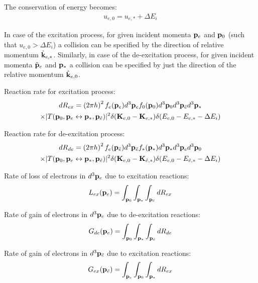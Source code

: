 \documentclass{article}[draft]
\begin{document}
The conservation of energy becomes:
\begin{align*}
u_{e,0} = u_{e,*} + \Delta E_i
\end{align*}

In case of the excitation process, for given incident momenta $\mathbf{p}_e$ and $\mathbf{p}_0$ (such that $u_{e,0} > \Delta E_i$) a collision can be specified by the direction of relative momentum $\hat{\mathbf{k}}_{e,*}$. Similarly, in case of the de-excitation process, for given incident momenta $\tilde{\mathbf{p}}_e$ and $\mathbf{p}_*$ a collision can be specified by just the direction of the relative momentum $\hat{\mathbf{k}}_{e,0}$.

Reaction rate for excitation process:
\begin{multline*}
d R_{ex} = \left( 2 \pi \planck \right)^2 
f_e\of{\vect{p}_e} d^3 \vect{p}_e f_0\of{\vect{p}_0} d^3 \vect{p}_0
d^3 \vect{p}_{\tilde{e}} d^3 \vect{p}_*
\\
\times
| T\of{\vect{p}_0, \vect{p}_e \leftrightarrow \vect{p}_*, \vect{p}_{\tilde{e}}} |^2
\delta\of{\vect{K}_{e,0} - \vect{K}_{e,*}} 
\delta\of{E_{e,0} - E_{e,*} - \Delta E_i}
\end{multline*}

Reaction rate for de-excitation process:
\begin{multline*}
d R_{de} = \left( 2 \pi \planck \right)^2 
f_e\of{\vect{p}_{\tilde{e}}} d^3 \vect{p}_{\tilde{e}} f_*\of{\vect{p}_*} d^3 \vect{p}_*
d^3 \vect{p}_{e} d^3 \vect{p}_0
\\
\times
| T\of{\vect{p}_0, \vect{p}_e \leftrightarrow \vect{p}_*, \vect{p}_{\tilde{e}}} |^2
\delta\of{\vect{K}_{e,0} - \vect{K}_{\tilde{e},*}} 
\delta\of{E_{e,0} - E_{\tilde{e},*} - \Delta E_i}
\end{multline*}

Rate of loss of electrons in $d^3 \mathbf{p}_e$ due to excitation reactions:
\begin{align*}
L_{ex}\of{\vect{p}_e} = \int_{\vect{p}_0} \int_{\vect{p}_*} \int_{\vect{p}_\te} d R_{ex}
\end{align*}

Rate of gain of electrons in $d^3 \mathbf{p}_e$ due to de-excitation reactions:
\begin{align*}
G_{de}\of{\vect{p}_e} = \int_{\vect{p}_0} \int_{\vect{p}_*} \int_{\vect{p}_\te} d R_{de}
\end{align*}

Rate of gain of electrons in $d^3 \mathbf{p}_{\tilde{e}}$ due to excitation reactions:
\begin{align*}
G_{ex}\of{\vect{p}_\te} = \int_{\vect{p}_e} \int_{\vect{p}_0} \int_{\vect{p}_*} d R_{ex}
\end{align*}
\end{document}
